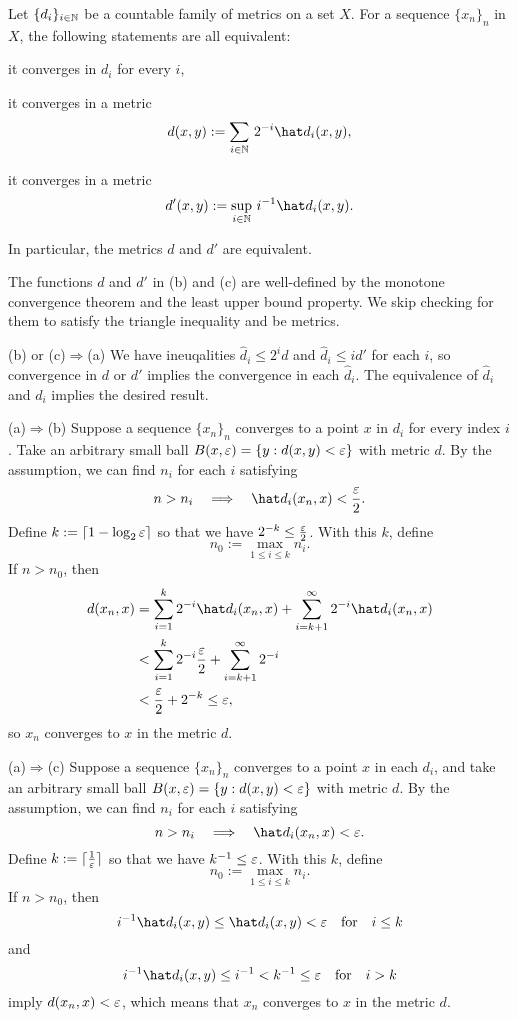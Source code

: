 \documentclass{../../large}
\begin{document}
\begin{prop}
Let $\{d_i\}_{i\in\mathbb{N}}$ be a countable family of metrics on a set $X$.
For a sequence $\{x_n\}_n$ in $X$, the following statements are all equivalent:
\begin{parts}
\item it converges in $d_i$ for every $i$,
\item it converges in a metric
\[d(x,y):=\sum_{i\in\N}\,2^{-i}\hat d_i(x,y),\]
\item it converges in a metric
\[d'(x,y):=\sup_{i\in\N}\,i^{-1}\hat d_i(x,y).\]
\end{parts}
In particular, the metrics $d$ and $d'$ are equivalent.
\end{prop}
\begin{pf}
The functions $d$ and $d'$ in (b) and (c) are well-defined by the monotone convergence theorem and the least upper bound property.
We skip checking for them to satisfy the triangle inequality and be metrics.

(b) or (c)$\Rightarrow$(a)
We have ineuqalities $\hat d_i\le2^id$ and $\hat d_i\le id'$ for each $i$, so convergence in $d$ or $d'$ implies the convergence in each $\hat d_i$.
The equivalence of $\hat d_i$ and $d_i$ implies the desired result.

(a)$\Rightarrow$(b)
Suppose a sequence $\{x_n\}_n$ converges to a point $x$ in $d_i$ for every index $i$.
Take an arbitrary small ball $B(x,\varepsilon)=\{y:d(x,y)<\varepsilon\}$ with metric $d$.
By the assumption, we can find $n_i$ for each $i$ satisfying
\[n>n_i\impl\hat d_i(x_n,x)<\frac\e2.\]
Define $k:=\lceil1-\log_2\varepsilon\rceil$ so that we have $2^{-k}\le\frac{\varepsilon}2$.
With this $k$, define
\[n_0:=\max_{1\le i\le k}n_i.\]
If $n>n_0$, then
\begin{align*}
d(x_n,x)&=\sum_{i=1}^k2^{-i}\hat d_i(x_n,x)+\sum_{i=k+1}^\infty2^{-i}\hat d_i(x_n,x)\\
&<\sum_{i=1}^k2^{-i}\frac\e2+\sum_{i=k+1}^\infty2^{-i}\\
&<\frac\e2+2^{-k}\le\e,
\end{align*}
so $x_n$ converges to $x$ in the metric $d$.

(a)$\Rightarrow$(c)
Suppose a sequence $\{x_n\}_n$ converges to a point $x$ in each $d_i$, and take an arbitrary small ball $B(x,\varepsilon)=\{y:d(x,y)<\varepsilon\}$ with metric $d$.
By the assumption, we can find $n_i$ for each $i$ satisfying
\[n>n_i\impl\hat d_i(x_n,x)<\e.\]
Define $k:=\lceil\frac1{\varepsilon}\rceil$ so that we have $k^{-1}\le\varepsilon$.
With this $k$, define
\[n_0:=\max_{1\le i\le k}n_i.\]
If $n>n_0$, then
\[i^{-1}\hat d_i(x,y)\le\hat d_i(x,y)<\e\quad\text{for}\quad i\le k\]
and
\[i^{-1}\hat d_i(x,y)\le i^{-1}<k^{-1}\le\e\quad\text{for}\quad i>k\]
imply $d(x_n,x)<\varepsilon$, which means that $x_n$ converges to $x$ in the metric $d$.
\end{pf}
\end{document}
